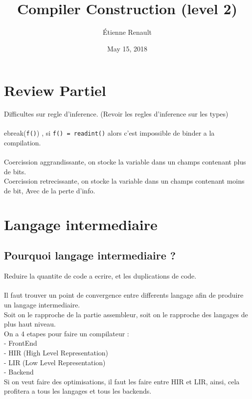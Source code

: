 \documentclass[a4paper,11pt]{article}
\title{Compiler Construction (level 2)}
\author{Étienne Renault}
\date{May 15, 2018}
\begin{document}
\maketitle
\tableofcontents
\newpage

\section*{Review Partiel}

Difficultes sur regle d'inference. (Revoir les regles d'inference sur les types)\\\\
ebreak(\texttt{f()}) , si \texttt{f() = readint()} alors c'est impossible de binder  a la compilation.\\\\
Coercission  aggrandissante, on stocke la variable dans un champs contenant plus de bits.\\
Coercission retrecissante, on stocke la variable dans un champs contenant moins de bit, Avec de la perte d'info.

\section{Langage intermediaire}

\subsection{Pourquoi langage intermediaire ?}
Reduire la quantite de code a ecrire, et les duplications de code.\\\\
Il faut trouver un point de convergence entre differents langage afin de produire  un langage intermediaire.\\
Soit on le rapproche de la partie assembleur, soit on le rapproche des langages de plus haut niveau.\\

On a 4 etapes pour faire un compilateur :\\
- FrontEnd\\
- HIR (High Level Representation)\\
- LIR (Low Level Representation)\\
- Backend\\

Si on veut faire des optimisations, il faut les faire entre HIR et LIR, ainsi, cela profitera a tous les langages et tous les backends.\\
\end{document}
